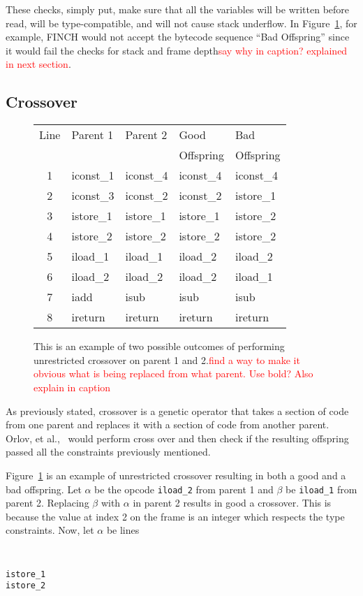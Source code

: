 \documentclass{sig-alternate}
\newcommand{\mycomment}[1]{\textcolor{red}{#1}}
\begin{document}
These checks, simply put, make sure that all the variables will be written before read, will be type-compatible, and will not cause stack underflow\cite{FINCH2:2009}. In Figure~\ref{crossover}, for example, FINCH would not accept the bytecode sequence ``Bad Offspring'' since it would fail the checks for stack and frame depth\mycomment{say why in caption? explained in next section}.


\subsection{Crossover}

\begin{figure}
\begin{tabular}{|c|l|l|l|l|}

\hline
Line&Parent 1&Parent 2&Good&Bad\\  
 &         &         &Offspring&Offspring\\ \hline
1&iconst\_1&iconst\_4&iconst\_4&iconst\_4\\
2&iconst\_3&iconst\_2&iconst\_2&istore\_1\\
3&istore\_1&istore\_1&istore\_1&istore\_2\\
4&istore\_2&istore\_2&istore\_2&istore\_2\\
5&iload\_1&iload\_1&iload\_2&iload\_2\\
6&iload\_2&iload\_2&iload\_2&iload\_1\\
7&iadd&isub&isub&isub\\
8&ireturn&ireturn&ireturn&ireturn\\
\hline
\end{tabular}
\caption{This is an example of two possible outcomes of performing unrestricted crossover on parent 1 and 2.\mycomment{find a way to make it obvious what is being replaced from what parent. Use bold? Also explain in caption}}
\label{crossover}
  
\end{figure}
As previously stated, crossover is a genetic operator that takes a section of code from one parent and replaces it with a section of code from another parent. Orlov, et al.,~\cite{FINCH:2011} would perform cross over and then check if the resulting offspring passed all the constraints previously mentioned.\par 

Figure~\ref{crossover} is an example of unrestricted crossover resulting in both a good and a bad offspring. Let $\alpha$ be the opcode \texttt{iload\_2} from parent 1 and $\beta$ be \texttt{iload\_1} from parent 2. Replacing $\beta$ with $\alpha$ in parent 2 results in good a crossover. This is because the value at index 2 on the frame is an integer which respects the type constraints. Now, let $\alpha$ be lines
{\tt
\begin{verbatim}
istore_1
istore_2
\end{verbatim}}
\end{document}
